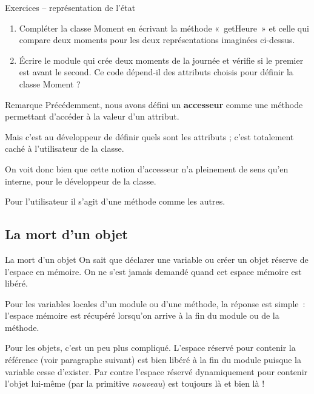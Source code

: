 \begin{frame}{Exercices – représentation de l'état}
		\begin{enumerate}
			\item 
				Compléter la classe Moment en écrivant la méthode «~getHeure~» et celle
				qui compare deux moments pour les deux représentations imaginées
				ci-dessus.
			\item 
				Écrire le module qui crée deux moments de la journée et vérifie si le
				premier est avant le second. Ce code dépend-il des attributs choisis
				pour définir la classe Moment ?
		\end{enumerate}
\end{frame}

\begin{frame}{Remarque}
	Précédemment, nous avons défini un \textbf{accesseur} comme une méthode
	permettant d’accéder à la valeur d’un attribut. 
	
	Mais c’est au	développeur de définir quels sont les attributs ; 
	c’est totalement caché à l’utilisateur de la classe. 
	
	On voit donc bien que cette notion
	d’accesseur n’a pleinement de sens qu’en interne, pour le développeur
	de la classe. 
	
	Pour l’utilisateur il s’agit d’une méthode comme les autres.
\end{frame}

\subsection{La mort d'un objet}

\begin{frame}{La mort d'un objet}
	On sait que déclarer une variable ou créer un objet réserve de l’espace
	en mémoire. On ne s’est jamais demandé quand cet espace mémoire est
	libéré.
	
	\bigskip
	
	Pour les variables locales d’un module ou d'une
	méthode, la réponse est simple~: l’espace mémoire est récupéré
	lorsqu’on arrive à la fin du module ou de la méthode.
	
	\bigskip
	
	Pour les objets, c’est un peu plus compliqué. L’espace réservé pour
	contenir la référence (voir paragraphe suivant) est bien libéré à la
	fin du module puisque la variable cesse d’exister. Par contre l’espace
	réservé dynamiquement pour contenir l’objet lui-même (par la primitive
	\textit{nouveau}) est toujours là et bien là !
	
\end{frame}

